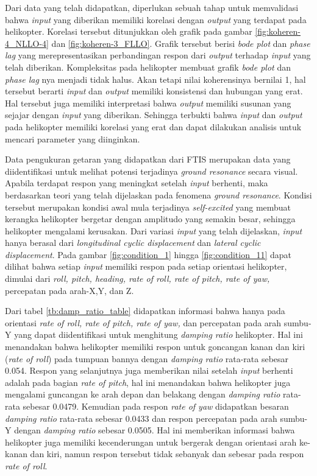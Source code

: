 Dari data yang telah didapatkan, diperlukan sebuah tahap untuk memvalidasi bahwa \textit{input} yang diberikan memiliki korelasi dengan \textit{output} yang terdapat pada helikopter. Korelasi tersebut ditunjukkan oleh grafik pada gambar \ref{fig:koheren-4_NLLO-4} dan \ref{fig:koheren-3_FLLO}. Grafik tersebut berisi \textit{bode plot} dan \textit{phase lag} yang merepresentasikan perbandingan respon dari \textit{output} terhadap \textit{input} yang telah diberikan. Kompleksitas pada helikopter membuat grafik \textit{bode plot} dan \textit{phase lag} nya menjadi tidak halus. Akan tetapi nilai koherensinya bernilai 1, hal tersebut berarti \textit{input} dan \textit{output} memiliki konsistensi dan hubungan yang erat. Hal tersebut juga memiliki interpretasi bahwa \textit{output} memiliki susunan yang sejajar dengan \textit{input} yang diberikan. Sehingga terbukti bahwa \textit{input} dan \textit{output} pada helikopter memiliki korelasi yang erat dan dapat dilakukan analisis untuk mencari parameter yang diinginkan.

Data pengukuran getaran yang didapatkan dari FTIS merupakan data yang diidentifikasi untuk melihat potensi terjadinya \textit{ground resonance} secara visual. Apabila terdapat respon yang meningkat setelah \textit{input} berhenti, maka berdasarkan teori yang telah dijelaskan pada fenomena \textit{ground resonance}. Kondisi tersebut merupakan kondisi awal mula terjadinya \textit{self-excited} yang membuat kerangka helikopter bergetar dengan amplitudo yang semakin besar, sehingga helikopter mengalami kerusakan. Dari variasi \textit{input} yang telah dijelaskan, \textit{input} hanya berasal dari \textit{longitudinal cyclic displacement} dan \textit{lateral cyclic displacement}. Pada gambar \ref{fig:condition_1} hingga \ref{fig:condition_11} dapat dilihat bahwa setiap \textit{input} memiliki respon pada setiap orientasi helikopter, dimulai dari \textit{roll, pitch, heading, rate of roll, rate of pitch, rate of yaw,} percepatan pada arah-X,Y, dan Z. 

Dari tabel \ref{tb:damp_ratio_table} didapatkan informasi bahwa hanya pada orientasi \textit{rate of roll, rate of pitch, rate of yaw,} dan percepatan pada arah sumbu-Y yang dapat diidentifikasi untuk menghitung \textit{damping ratio} helikopter. Hal ini menandakan bahwa helikopter memiliki respon untuk goncangan kanan dan kiri (\textit{rate of roll}) pada tumpuan bannya dengan \textit{damping ratio} rata-rata sebesar 0.054. Respon yang selanjutnya juga memberikan nilai setelah \textit{input} berhenti adalah pada bagian \textit{rate of pitch}, hal ini menandakan bahwa helikopter juga mengalami guncangan ke arah depan dan belakang dengan \textit{damping ratio} rata-rata sebesar 0.0479. Kemudian pada respon \textit{rate of yaw} didapatkan besaran \textit{damping ratio} rata-rata sebesar 0.0433 dan respon percepatan pada arah sumbu-Y dengan \textit{damping ratio} sebesar 0.0505. Hal ini memberikan informasi bahwa helikopter juga memiliki kecenderungan untuk bergerak dengan orientasi arah ke-kanan dan kiri, namun respon tersebut tidak sebanyak dan sebesar pada respon \textit{rate of roll}.

